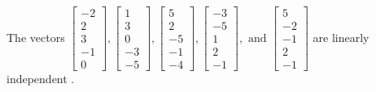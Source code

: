 \begin{exercise}
\begin{exerciseStatement}
  \end{exerciseStatement}
  \begin{exerciseAnswer}
   The vectors \(\left[\begin{array}{r}
-2 \\
2 \\
3 \\
-1 \\
0
\end{array}\right] , \left[\begin{array}{r}
1 \\
3 \\
0 \\
-3 \\
-5
\end{array}\right] , \left[\begin{array}{r}
5 \\
2 \\
-5 \\
-1 \\
-4
\end{array}\right] , \left[\begin{array}{r}
-3 \\
-5 \\
1 \\
2 \\
-1
\end{array}\right] , \text{ and } \left[\begin{array}{r}
5 \\
-2 \\
-1 \\
2 \\
-1
\end{array}\right]\) are 
  	 linearly independent  .
  


  \end{exerciseAnswer}
\end{exercise}